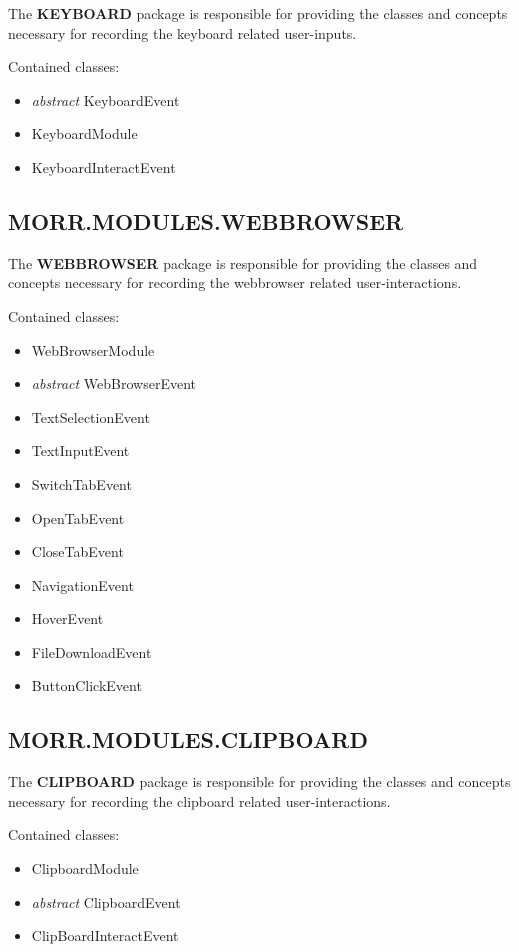 The \textbf{KEYBOARD} package is responsible for providing the classes and concepts necessary for recording the keyboard related user-inputs.

Contained classes:
\begin{itemize}
\item \textit{abstract} KeyboardEvent
\item KeyboardModule
\item KeyboardInteractEvent
\end{itemize}

\newpage
\subsection*{MORR.MODULES.WEBBROWSER}

The \textbf{WEBBROWSER} package is responsible for providing the classes and concepts necessary for recording the webbrowser related user-interactions.

Contained classes:
\begin{itemize}
\item WebBrowserModule
\item \textit{abstract} WebBrowserEvent
\item TextSelectionEvent
\item TextInputEvent
\item SwitchTabEvent
\item OpenTabEvent
\item CloseTabEvent
\item NavigationEvent
\item HoverEvent
\item FileDownloadEvent
\item ButtonClickEvent
\end{itemize}

\newpage
\subsection*{MORR.MODULES.CLIPBOARD}

The \textbf{CLIPBOARD} package is responsible for providing the classes and concepts necessary for recording the clipboard related user-interactions.

Contained classes:
\begin{itemize}
\item ClipboardModule
\item \textit{abstract} ClipboardEvent
\item ClipBoardInteractEvent
\end{itemize}

